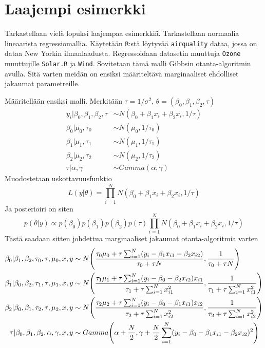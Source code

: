 \chapter{Laajempi esimerkki}

Tarkastellaan vielä lopuksi laajempaa esimerkkiä. Tarkastellaan normaalia lineaarista regressiomallia. Käytetään \texttt{R}:stä löytyvää \texttt{airquality} dataa, jossa on dataa New Yorkin ilmanlaadusta. Regressoidaan datasetin muuttuja \texttt{Ozone} muuttujille \texttt{Solar.R} ja \texttt{Wind}. Sovitetaan tämä malli Gibbsin otanta-algoritmin avulla. Sitä varten meidän on ensiksi määriteltävä marginaaliset ehdolliset jakaumat parametreille.

Määritellään ensiksi malli. Merkitään $\tau = 1/\sigma^2$, $\theta = (\beta_0,\beta_1,\beta_2,\tau)$
\begin{equation}
\begin{split}
	y_i|\beta_0,\beta_1,\beta_2,\tau &\sim N(\beta_0+\beta_1 x_i+\beta_2x_i, 1/\tau) \\
	\beta_0|\mu_0,\tau_0 &\sim N(\mu_0, 1/\tau_0) \\
	\beta_1|\mu_1,\tau_1 &\sim N(\mu_1, 1/\tau_1) \\
	\beta_2|\mu_2,\tau_2 &\sim N(\mu_2, 1/\tau_2) \\
	\tau|\alpha, \gamma &\sim Gamma(\alpha, \gamma)
\end{split}	
\end{equation}
Muodostetaan uskottavuusfunktio
\begin{equation}
	L(y|\theta) = \prod_{i=1}^{N} N(\beta_0+\beta_1 x_i+\beta_2x_i, 1/\tau)
\end{equation}
Ja posterioiri on siten 
\begin{equation}
	p(\theta|y) \propto p(\beta_0)p(\beta_1)p(\beta_2)p(\tau)\prod_{i=1}^{N} N(\beta_0+\beta_1 x_i+\beta_2x_i, 1/\tau)
\end{equation}
Tästä saadaan sitten johdettua marginaaliset jakaumat otanta-algoritmia varten
\begin{equation}\label{marginaalit}
\begin{split}
	\beta_0 | \beta_1,\beta_2,\tau_0,\tau,\mu_0,x,y &\sim 
	N\pqty{\frac{\tau_0\mu_0+\tau\sum_{i=1}^{N}(y_i-\beta_1x_{i1}-\beta_2x_{i2})}{\tau_0+\tau N}, \frac{1}{\tau_0+\tau N}} \\
	\beta_1 | \beta_0,\beta_2,\tau_1,\tau,\mu_1,x,y &\sim 
	N\pqty{\frac{\tau_1\mu_1+\tau\sum_{i=1}^{N}(y_i-\beta_0-\beta_2x_{i2})x_{i1}}{\tau_1+\tau\sum_{i=1}^{N}x_{i1}^2}, \frac{1}{\tau_1+\tau\sum_{i=1}^{N}x_{i1}^2}}\\
	\beta_2 | \beta_0,\beta_1,\tau_2,\tau,\mu_2,x,y &\sim 
	N\pqty{\frac{\tau_2\mu_2+\tau\sum_{i=1}^{N}(y_i-\beta_0-\beta_1x_{i1})x_{i2}}{\tau_2+\tau\sum_{i=1}^{N}x_{i2}^2}, \frac{1}{\tau_2+\tau\sum_{i=1}^{N}x_{i2}^2}}\\
	\tau | \beta_0,\beta_1,\beta_2,\alpha,\gamma,x,y &\sim 
	Gamma\pqty{\alpha+\frac{N}{2},\gamma + \frac{N}{2}\sum_{i=1}^{N}(y_i-\beta_0-\beta_1x_{i1}-\beta_2x_{i2})^2}
\end{split}
\end{equation}
